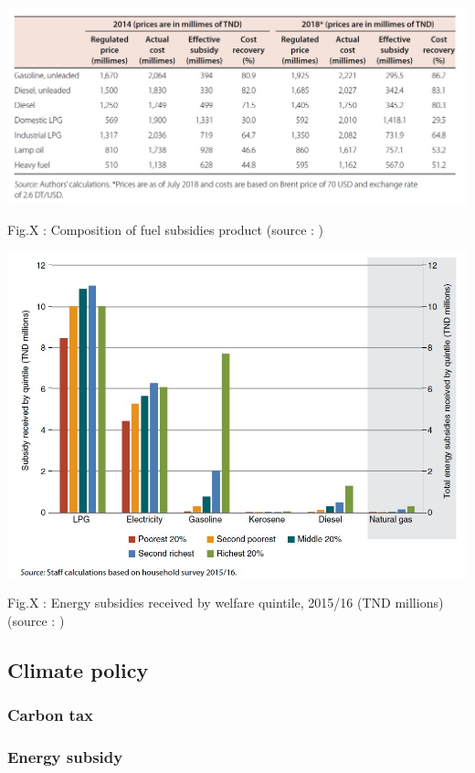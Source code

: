\documentclass[
]{article}
\begin{document}
\includegraphics{Images/Composition of fuel subsidies by product.jpg}

Fig.X : Composition of fuel subsidies product (source :
\textcite{tunisia2020})

\includegraphics{Images/Energy subsdies received by welfare quintile.jpg}

Fig.X : Energy subsidies received by welfare quintile, 2015/16 (TND
millions) (source : \textcite{tunisia2020})

\hypertarget{climate-policy}{%
\subsection{Climate policy}\label{climate-policy}}

\hypertarget{carbon-tax}{%
\subsubsection{Carbon tax}\label{carbon-tax}}

\hypertarget{energy-subsidy}{%
\subsubsection{Energy subsidy}\label{energy-subsidy}}
\end{document}

